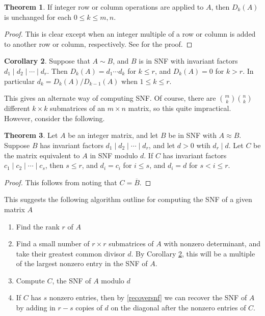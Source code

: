 \documentclass[12pt,a4paper,answers]{exam}
\theoremstyle{definition}
\newtheorem{theorem}{Theorem}[section]
\newtheorem{corollary}[theorem]{Corollary}
\begin{document}
\begin{theorem}
   If integer row or column operations are applied to $A$, then $D_k(A)$ is unchanged for each $0\leq k\leq m,n$.
\end{theorem}

\begin{proof}
  This is clear except when an integer multiple of a row or column is added to another row or column, respectively. See \cite{sims} for the proof.
\end{proof}

\begin{corollary}
  \label{gcdcor}
  Suppose that $A\sim B$, and $B$ is in SNF with invariant factors $d_1\mid d_2\mid\cdots\mid d_r$. Then $D_k(A)=d_1\cdots d_k$ for $k\leq r$, and $D_k(A)=0$ for $k>r$. In particular $d_k=D_k(A)/D_{k-1}(A)$ when $1\leq k\leq r$.
\end{corollary}

This gives an alternate way of computing SNF. Of course, there are $\binom{m}{k}\binom{n}{k}$ different $k\times k$ submatrices of an $m\times n$ matrix, so this quite impractical. However, consider the following.

\begin{theorem}
  \label{recoversnf}
  Let $A$ be an integer matrix, and let $B$ be in SNF with $A\approx B$. Suppose $B$ has invariant factors $d_1\mid d_2\mid \cdots\mid d_r$, and let $d>0$ wtih $d_r\mid d$. Let $C$ be the matrix equivalent to $A$ in SNF modulo $d$. If $C$ has invariant factors $c_1\mid c_2\mid\cdots\mid c_s$, then $s\leq r$, and $d_i=c_i$ for $i\leq s$, and $d_i=d$ for $s<i\leq r$.
\end{theorem}

\begin{proof}
  This follows from noting that $C=\overline{B}$.
\end{proof}

This suggests the following algorithm outline for computing the SNF of a given matrix $A$

\begin{enumerate}
\item Find the rank $r$ of $A$
\item Find a small number of $r\times r$ submatrices of $A$ with nonzero determinant, and take their greatest common divisor $d$. By Corollary \ref{gcdcor}, this will be a multiple of the largest nonzero entry in the SNF of $A$.
\item Compute $C$, the SNF of $A$ modulo $d$
\item If $C$ has $s$ nonzero entries, then by \autoref{recoversnf} we can recover the SNF of $A$ by adding in $r-s$ copies of $d$ on the diagonal after the nonzero entries of $C$.
\end{enumerate}
\end{document}
